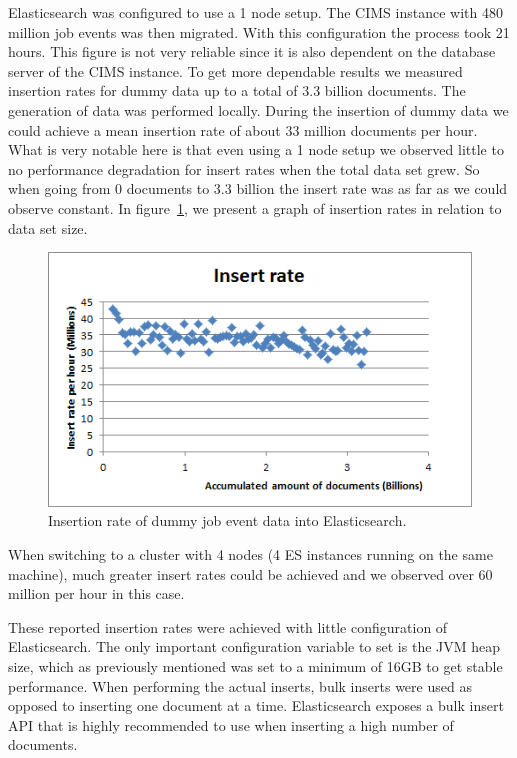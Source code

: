 Elasticsearch was configured to use a 1 node setup. The CIMS instance with 480 million job events was then migrated. With this configuration the process took 21 hours. This figure is not very reliable since it is also dependent on the database server of the CIMS instance. To get more dependable results we measured insertion rates for dummy data up to a total of 3.3 billion documents. The generation of data was performed locally. During the insertion of dummy data we could achieve a mean insertion rate of about 33 million documents per hour. What is very notable here is that even using a 1 node setup we observed little to no performance degradation for insert rates when the total data set grew. So when going from 0 documents to 3.3 billion the insert rate was as far as we could observe constant. In figure~\ref{fig:insert_rate}, we present a graph of insertion rates in relation to data set size.
\begin{figure}[h!]
\centering
\includegraphics[]{figure/insert_rate.png}
\caption{Insertion rate of dummy job event data into Elasticsearch.}
\label{fig:insert_rate}
\end{figure}

When switching to a cluster with 4 nodes (4 ES instances running on the same machine), much greater insert rates could be achieved and we observed over 60 million per hour in this case.

These reported insertion rates were achieved with little configuration of Elasticsearch. The only important configuration variable to set is the JVM heap size, which as previously mentioned was set to a minimum of 16GB to get stable performance. When performing the actual inserts, bulk inserts were used as opposed to inserting one document at a time. Elasticsearch exposes a bulk insert API that is highly recommended to use when inserting a high number of documents.

